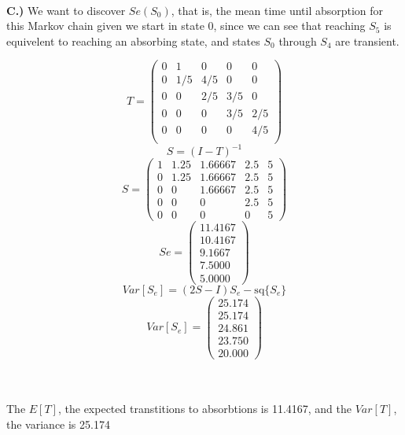 \documentclass{article}
\begin{document}
\\\textbf{C.)} We want to discover $Se(S_0)$, that is, the mean time until
absorption for this Markov chain given we start in state 0, since we can see
that reaching $S_5$ is equivelent to reaching an absorbing state, and states
$S_0$ through $S_4$ are transient. 

\[T = \left(\begin{array}{rrrrr}
0&  1&  0&  0&  0\\
0&1/5&4/5&  0&  0\\
0&  0&2/5&3/5&  0\\
0&  0&  0&3/5&2/5\\
0&  0&  0&  0&4/5\\
\end{array}\right)\]
\[ S = (I - T)^{-1} \]
\[ S = \left(\begin{array}{rrrrr}
  1 & 1.25 &   1.66667 &  2.5  & 5 \\
  0 & 1.25 &  1.66667 &  2.5 &  5 \\
  0 & 0 &  1.66667  & 2.5 &  5 \\
  0 & 0 & 0 &  2.5 &  5\\
  0 & 0 & 0 & 0 &  5
\end{array}\right)\]
\[ Se = \left(\begin{array}{r}
   11.4167\\
   10.4167\\
    9.1667\\
    7.5000\\
    5.0000
\end{array}\right)\]
\[Var[S_e] = (2S - I)S_e - \mbox{sq}\{S_e\}\]
\[Var[S_e] = 
\left(\begin{array}{r}
 25.174 \\
 25.174 \\
 24.861 \\
 23.750 \\
 20.000
\end{array}\right)\]

\\
\\The $E[T]$, the expected transtitions to absorbtions is 11.4167, and
the $Var[T]$, the variance is 25.174
\end{document}
